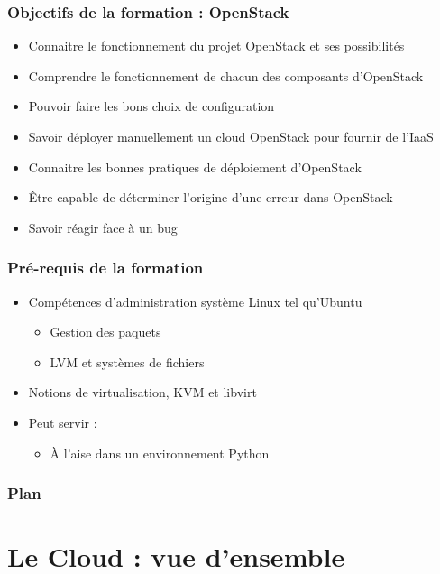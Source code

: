   \begin{frame}
    \frametitle{Objectifs de la formation : OpenStack}
    \begin{itemize}
      \item Connaitre le fonctionnement du projet OpenStack et ses possibilités
      \item Comprendre le fonctionnement de chacun des composants d'OpenStack
      \item Pouvoir faire les bons choix de configuration
      \item Savoir déployer manuellement un cloud OpenStack pour fournir de l'IaaS
      \item Connaitre les bonnes pratiques de déploiement d'OpenStack
      \item Être capable de déterminer l'origine d'une erreur dans OpenStack
      \item Savoir réagir face à un bug
    \end{itemize}
  \end{frame}

  \begin{frame}
    \frametitle{Pré-requis de la formation}
    \begin{itemize}
      \item Compétences d'administration système Linux tel qu'Ubuntu
      \begin{itemize}
        \item Gestion des paquets
        \item LVM et systèmes de fichiers
      \end{itemize}
      \item Notions de virtualisation, KVM et libvirt
      \item Peut servir :
      \begin{itemize}
        \item À l'aise dans un environnement Python
      \end{itemize}
    \end{itemize}
  \end{frame}

  \begin{frame}
    \frametitle{Plan}
    \tableofcontents[hideallsubsections]
  \end{frame}

  \section[Cloud]{Le Cloud : vue d'ensemble}

